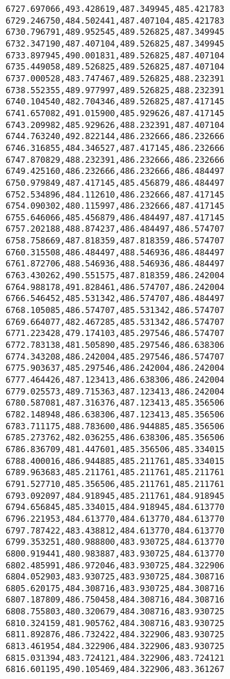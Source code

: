 \documentclass[11pt]{article}
\begin{document}
\begin{Verbatim}[commandchars=\\\{\}]
6727.697066,493.428619,487.349945,485.421783
6729.246750,484.502441,487.407104,485.421783
6730.796791,489.952545,489.526825,487.349945
6732.347190,487.407104,489.526825,487.349945
6733.897945,490.001831,489.526825,487.407104
6735.449058,489.526825,489.526825,487.407104
6737.000528,483.747467,489.526825,488.232391
6738.552355,489.977997,489.526825,488.232391
6740.104540,482.704346,489.526825,487.417145
6741.657082,491.015900,485.929626,487.417145
6743.209982,485.929626,488.232391,487.407104
6744.763240,492.822144,486.232666,486.232666
6746.316855,484.346527,487.417145,486.232666
6747.870829,488.232391,486.232666,486.232666
6749.425160,486.232666,486.232666,486.484497
6750.979849,487.417145,485.456879,486.484497
6752.534896,484.112610,486.232666,487.417145
6754.090302,480.115997,486.232666,487.417145
6755.646066,485.456879,486.484497,487.417145
6757.202188,488.874237,486.484497,486.574707
6758.758669,487.818359,487.818359,486.574707
6760.315508,486.484497,488.546936,486.484497
6761.872706,488.546936,488.546936,486.484497
6763.430262,490.551575,487.818359,486.242004
6764.988178,491.828461,486.574707,486.242004
6766.546452,485.531342,486.574707,486.484497
6768.105085,486.574707,485.531342,486.574707
6769.664077,482.467285,485.531342,486.574707
6771.223428,479.174103,485.297546,486.574707
6772.783138,481.505890,485.297546,486.638306
6774.343208,486.242004,485.297546,486.574707
6775.903637,485.297546,486.242004,486.242004
6777.464426,487.123413,486.638306,486.242004
6779.025573,489.715363,487.123413,486.242004
6780.587081,487.316376,487.123413,485.356506
6782.148948,486.638306,487.123413,485.356506
6783.711175,488.783600,486.944885,485.356506
6785.273762,482.036255,486.638306,485.356506
6786.836709,481.447601,485.356506,485.334015
6788.400016,486.944885,485.211761,485.334015
6789.963683,485.211761,485.211761,485.211761
6791.527710,485.356506,485.211761,485.211761
6793.092097,484.918945,485.211761,484.918945
6794.656845,485.334015,484.918945,484.613770
6796.221953,484.613770,484.613770,484.613770
6797.787422,483.438812,484.613770,484.613770
6799.353251,480.988800,483.930725,484.613770
6800.919441,480.983887,483.930725,484.613770
6802.485991,486.972046,483.930725,484.322906
6804.052903,483.930725,483.930725,484.308716
6805.620175,484.308716,483.930725,484.308716
6807.187809,486.750458,484.308716,484.308716
6808.755803,480.320679,484.308716,483.930725
6810.324159,481.905762,484.308716,483.930725
6811.892876,486.732422,484.322906,483.930725
6813.461954,484.322906,484.322906,483.930725
6815.031394,483.724121,484.322906,483.724121
6816.601195,490.105469,484.322906,483.361267

\end{Verbatim}
\end{document}
